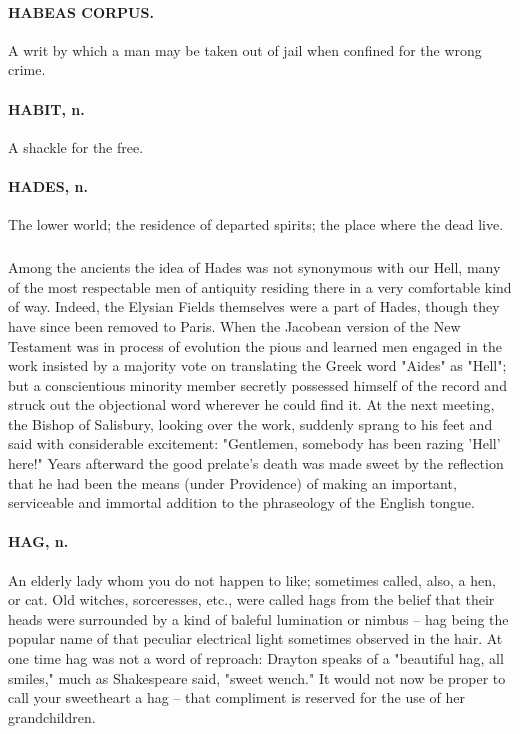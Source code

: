 \documentclass[11pt]{article}
\begin{document}
\paragraph{HABEAS CORPUS.}  A writ by which a man may be taken out of jail when
confined for the wrong crime.

\paragraph{HABIT, n.}  A shackle for the free.

\paragraph{HADES, n.}  The lower world; the residence of departed spirits; the
place where the dead live.
\subparagraph{}   Among the ancients the idea of Hades was not synonymous with our 
Hell, many of the most respectable men of antiquity residing there in 
a very comfortable kind of way.  Indeed, the Elysian Fields themselves
were a part of Hades, though they have since been removed to Paris.
When the Jacobean version of the New Testament was in process of
evolution the pious and learned men engaged in the work insisted by a
majority vote on translating the Greek word "Aides" as "Hell"; but a
conscientious minority member secretly possessed himself of the record
and struck out the objectional word wherever he could find it.  At the
next meeting, the Bishop of Salisbury, looking over the work, suddenly
sprang to his feet and said with considerable excitement:  "Gentlemen,
somebody has been razing 'Hell' here!"  Years afterward the good
prelate's death was made sweet by the reflection that he had been the
means (under Providence) of making an important, serviceable and
immortal addition to the phraseology of the English tongue.

\paragraph{HAG, n.}  An elderly lady whom you do not happen to like; sometimes
called, also, a hen, or cat.  Old witches, sorceresses, etc., were
called hags from the belief that their heads were surrounded by a kind
of baleful lumination or nimbus -- hag being the popular name of that
peculiar electrical light sometimes observed in the hair.  At one time
hag was not a word of reproach:  Drayton speaks of a "beautiful hag,
all smiles," much as Shakespeare said, "sweet wench."  It would not
now be proper to call your sweetheart a hag -- that compliment is
reserved for the use of her grandchildren.
\end{document}
